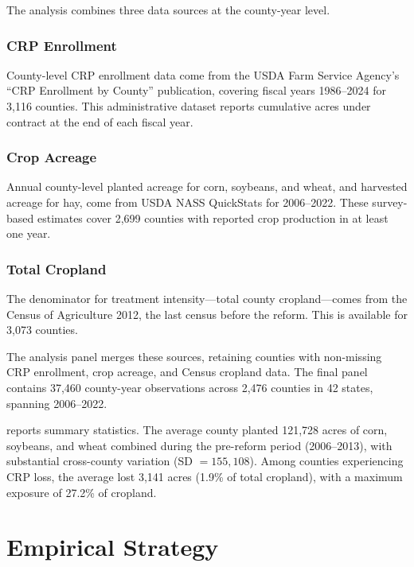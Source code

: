 \documentclass[12pt]{article}
\begin{document}
The analysis combines three data sources at the county-year level.

\subsubsection*{CRP Enrollment} County-level CRP enrollment data come from the USDA Farm Service Agency's ``CRP Enrollment by County'' publication, covering fiscal years 1986--2024 for 3,116 counties. This administrative dataset reports cumulative acres under contract at the end of each fiscal year.

\subsubsection*{Crop Acreage} Annual county-level planted acreage for corn, soybeans, and wheat, and harvested acreage for hay, come from USDA NASS Quick\-Stats for 2006--2022. These survey-based estimates cover 2,699 counties with reported crop production in at least one year.

\subsubsection*{Total Cropland} The denominator for treatment intensity---total county cropland---comes from the Census of Agriculture 2012, the last census before the reform. This is available for 3,073 counties.

The analysis panel merges these sources, retaining counties with non-missing CRP enrollment, crop acreage, and Census cropland data. The final panel contains 37,460 county-year observations across 2,476 counties in 42 states, spanning 2006--2022.



 reports summary statistics. The average county planted 121,728 acres of corn, soybeans, and wheat combined during the pre-reform period (2006--2013), with substantial cross-county variation (SD $= 155,108$). Among counties experiencing CRP loss, the average lost 3,141 acres (1.9\% of total cropland), with a maximum exposure of 27.2\% of cropland.

\section{Empirical Strategy}
\end{document}
